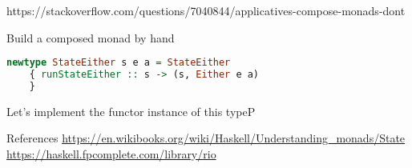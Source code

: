https://stackoverflow.com/questions/7040844/applicatives-compose-monads-dont


 Build a composed monad by hand


 \begin{lstlisting}[language=haskell]
newtype StateEither s e a = StateEither
    { runStateEither :: s -> (s, Either e a)
    }
\end{lstlisting}

Let's implement the functor instance of this typeP


 References
 \url{https://en.wikibooks.org/wiki/Haskell/Understanding_monads/State}
 \url{https://haskell.fpcomplete.com/library/rio}
